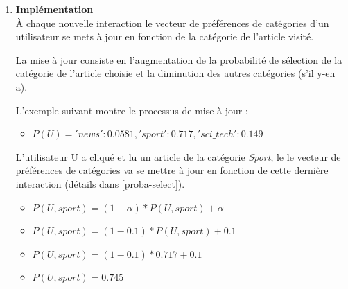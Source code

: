 \begin{enumerate}[leftmargin=*]
            \item\textbf{Implémentation}\\
            À chaque nouvelle interaction le vecteur de préférences de catégories d'un utilisateur se mets à jour en fonction de la catégorie  de l'article visité. 

            La mise à jour consiste en l'augmentation de la probabilité de sélection de la catégorie de l'article choisie et la diminution des autres catégories (s'il y-en a). 

            L'exemple suivant montre le processus de mise à jour :
            \begin{itemize}[label={}]
                \item $P(U) = {'news': 0.0581,'sport': 0.717, 'sci\_tech': 0.149}$\\
            \end{itemize}

            L'utilisateur U a cliqué et lu un article de la catégorie \emph{Sport}, le le vecteur de préférences de catégories va se mettre à jour en fonction de cette dernière interaction (détails dans \ref{proba-select}).
            \begin{itemize}[label={}]
                \item $P(U, sport) = (1-{\alpha}) * {P(U, sport)} + {\alpha}$
                \item $P(U, sport) = (1-{0.1}) * {P(U, sport)} + {0.1}$
                \item $P(U, sport) = (1-{0.1}) * {0.717} + {0.1}$
                \item $P(U, sport) = 0.745$
            \end{itemize}


\end{enumerate}
